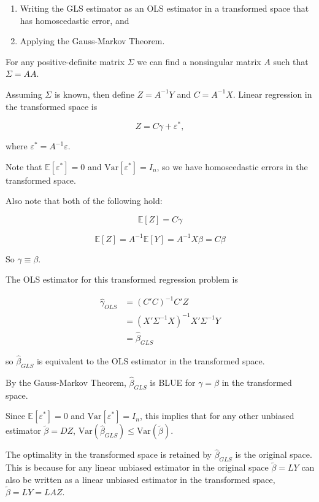\documentclass[
  letterpaper,
  DIV=11,
  numbers=noendperiod]{scrreport}
\providecommand{\tightlist}{%
  \setlength{\itemsep}{0pt}\setlength{\parskip}{0pt}}\usepackage{longtable,booktabs,array}
\begin{document}
\begin{enumerate}
\def\labelenumi{\arabic{enumi}.}
\tightlist
\item
  Writing the GLS estimator as an OLS estimator in a transformed space
  that has homoscedastic error, and
\item
  Applying the Gauss-Markov Theorem.
\end{enumerate}

For any positive-definite matrix \(\Sigma\) we can find a nonsingular
matrix \(A\) such that \(\Sigma = AA\).

Assuming \(\Sigma\) is known, then define \(Z = A^{-1} Y\) and
\(C = A^{-1} X\). Linear regression in the transformed space is

\[
Z = C \gamma + \varepsilon^*,
\]

where \(\varepsilon^* = A^{-1} \varepsilon\).

Note that \(\mathbb E[\varepsilon^*] = 0\) and
\(\text{Var}[\varepsilon^*] = I_n\), so we have homoscedastic errors in
the transformed space.

Also note that both of the following hold:

\[\mathbb E[Z] = C \gamma
\]

\[
\mathbb E[Z] = A^{-1} \mathbb E[Y] = A^{-1} X \beta = C \beta 
\]

So \(\gamma \equiv \beta\).

The OLS estimator for this transformed regression problem is

\[
\begin{aligned}
\hat \gamma_{OLS} & = (C'C)^{-1} C' Z \\ 
& = (X'\Sigma^{-1}X)^{-1} X' \Sigma^{-1} Y \\ 
& = \hat \beta_{GLS}
\end{aligned}
\]

so \(\hat \beta_{GLS}\) is equivalent to the OLS estimator in the
transformed space.

By the Gauss-Markov Theorem, \(\hat \beta_{GLS}\) is BLUE for
\(\gamma = \beta\) in the transformed space.

Since \(\mathbb E[\varepsilon^*] = 0\) and
\(\text{Var}[\varepsilon^*] = I_n\), this implies that for any other
unbiased estimator \(\tilde \beta = DZ\),
\(\text{Var}(\hat \beta_{GLS}) \leq \text{Var}(\tilde \beta)\).

The optimality in the transformed space is retained by
\(\hat \beta_{GLS}\) is the original space. This is because for any
linear unbiased estimator in the original space \(\tilde \beta = LY\)
can also be written as a linear unbiased estimator in the transformed
space, \(\tilde \beta = LY = LAZ\).
\end{document}
